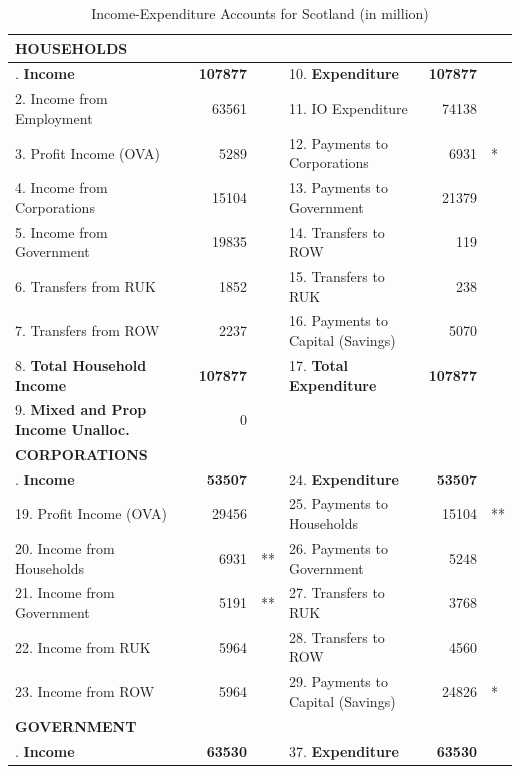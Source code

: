 \begin{table}[H] \caption{Income-Expenditure Accounts for Scotland (in \textsterling million)}
\bigskip \begin{scriptsize} \begin{centering} \begin{spacing}{1.2}
    \begin{tabular}{lrllrl}
          \toprule
    \textbf{HOUSEHOLDS} \bigstrut\\
    \hline  
\bigstrut[t]    1. \textbf{Income} & \textbf{107877} & & 10. \textbf{Expenditure} & \textbf{107877} & \\
    2. Income from Employment & 63561  &   & 11. IO Expenditure & 74138 & \\
    3. Profit Income (OVA) & 5289 & & 12. Payments to Corporations & 6931 &* \\
    4. Income from Corporations & 15104 & & 13. Payments to Government & 21379 & \\
    5. Income from Government & 19835 & & 14. Transfers to ROW & 119 & \\
    6. Transfers from RUK & 1852 & & 15. Transfers to RUK & 238 & \\
    7. Transfers from ROW & 2237 & & 16. Payments to Capital (Savings) & 5070 &\\
    8. \textbf{Total Household Income} & \textbf{107877} & & 17. \textbf{Total Expenditure} & \textbf{107877} & \\
    9. \textbf{Mixed and Prop Income Unalloc.} & 0 & \bigstrut[b]\\
    \hline
\bigstrut[t]    \textbf{CORPORATIONS} \bigstrut\\
    \hline
\bigstrut[t] 18. \textbf{Income} & \textbf{53507}  &   & 24. \textbf{Expenditure} & \textbf{53507} & \\
       19. Profit Income (OVA) & 29456 & & 25. Payments to Households & 15104 &** \\
       20. Income from Households & 6931 &** & 26. Payments to Government & 5248 & \\
       21. Income from Government & 5191 &** & 27. Transfers to RUK & 3768 & \\
       22. Income from RUK & 5964 & & 28. Transfers to ROW & 4560 & \\
       23. Income from ROW & 5964 & & 29. Payments to Capital (Savings) & 24826 &* \\
    \hline
    \textbf{GOVERNMENT} \bigstrut\\
    \hline
\bigstrut[t]       30. \textbf{Income} & \textbf{63530}  &   & 37. \textbf{Expenditure} & \textbf{63530} & \\

\end{tabular}
\end{spacing}
\end{centering}
\end{scriptsize}
\end{table}

